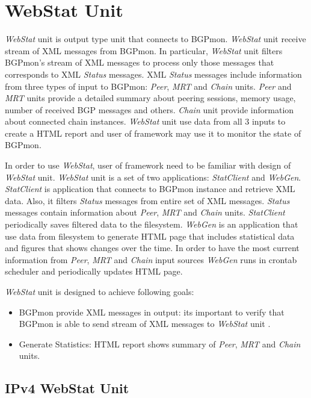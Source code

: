\section{WebStat Unit}
\label{sec:webclient}

\emph{WebStat} unit is output type unit that connects to BGPmon. \emph{WebStat} unit receive stream of XML messages from BGPmon. In particular, \emph{WebStat} unit filters BGPmon's stream of XML messages to process only those messages that corresponds to XML \emph{Status} messages. XML \emph{Status}  messages include information  from three types of input to BGPmon: \emph{Peer}, \emph{MRT} and \emph{Chain} units. \emph{Peer} and \emph{MRT} units provide a detailed summary about peering sessions, memory usage, number of received BGP messages and others. \emph{Chain} unit provide information about connected chain instances.   \emph{WebStat} unit use data from all 3 inputs to create a HTML report and user of framework may use it to monitor the state of  BGPmon. 

In order to use \emph{WebStat}, user of framework need to be familiar with design of \emph{WebStat} unit.   \emph{WebStat} unit is a set of two applications: \emph{StatClient} and \emph{WebGen}. \emph{StatClient} is application that connects to BGPmon instance and retrieve XML data. Also, it filters \emph{Status} messages from entire set of XML messages. \emph{Status} messages contain information about \emph{Peer}, \emph{MRT} and \emph{Chain} units. \emph{StatClient}  periodically saves filtered data to the filesystem. \emph{WebGen} is an application that use data from filesystem to generate HTML page that includes statistical data and figures that shows changes over the time. In order to have the most current information from \emph{Peer}, \emph{MRT} and \emph{Chain} input sources \emph{WebGen} runs in crontab scheduler and periodically updates HTML page. 

\emph{WebStat} unit is designed to achieve following goals:

\begin{itemize}
\item{BGPmon provide XML messages in output: its important to verify that BGPmon is able to send  stream of XML messages to \emph{WebStat} unit .}
\item{Generate Statistics: HTML report shows summary of \emph{Peer}, \emph{MRT} and \emph{Chain} units.}
\end{itemize}

\subsection{IPv4 WebStat Unit}

